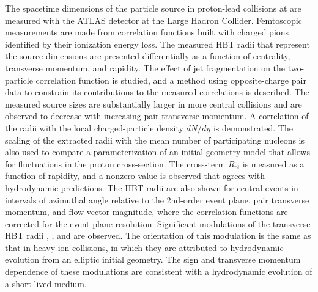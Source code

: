 The spacetime dimensions of the particle source in proton-lead collisions at \pPbenergy are measured with the ATLAS detector at the Large Hadron Collider.
Femtoscopic measurements are made from correlation functions built with charged pions identified by their ionization energy loss.
The measured HBT radii that represent the source dimensions are presented differentially as a function of centrality, transverse momentum, and rapidity.
The effect of jet fragmentation on the two-particle correlation function is studied, and a method using opposite-charge pair data to constrain its contributions to the measured correlations is described.
The measured source sizes are substantially larger in more central collisions and are observed to decrease with increasing pair transverse momentum.
A correlation of the radii with the local charged-particle density $dN/dy$ is demonstrated.
The scaling of the extracted radii with the mean number of participating nucleons is also used to compare a parameterization of an initial-geometry model that allows for fluctuations in the proton cross-section.
The cross-term $R_\mathrm{ol}$ is measured as a function of rapidity, and a nonzero value is observed that agrees with hydrodynamic predictions.
The HBT radii are also shown for central events in intervals of azimuthal angle relative to the 2nd-order event plane, pair transverse momentum, and flow vector magnitude, where the correlation functions are corrected for the event plane resolution.
Significant modulations of the transverse HBT radii \Rout, \Rside, and \Ros are observed.
The orientation of this modulation is the same as that in heavy-ion collisions, in which they are attributed to hydrodynamic evolution from an elliptic initial geometry.
The sign and transverse momentum dependence of these modulations are consistent with a hydrodynamic evolution of a short-lived medium.
